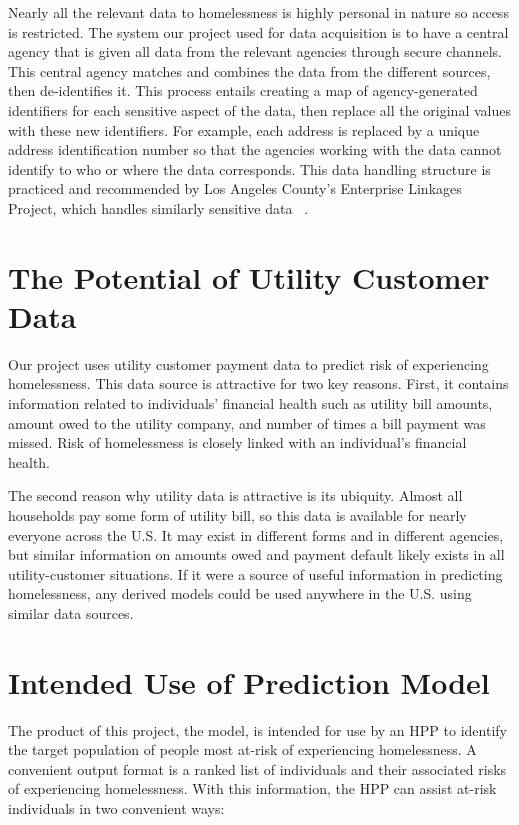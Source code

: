 \documentclass[10pt,letterpaper]{article}
\begin{document}
Nearly all the relevant data to homelessness is highly personal in nature so access is restricted. The system our project used for data acquisition is to have a central agency that is given all data from the relevant agencies through secure channels. This central agency matches and combines the data from the different sources, then de-identifies it. This process entails creating a map of agency-generated identifiers for each sensitive aspect of the data, then replace all the original values with these new identifiers. For example, each address is replaced by a unique address identification number so that the agencies working with the data cannot identify to who or where the data corresponds. This data handling structure is practiced and recommended by Los Angeles County’s Enterprise Linkages Project, which handles similarly sensitive data ~\cite{byrne2012angeles}.

\section{The Potential of Utility Customer Data}
Our project uses utility customer payment data to predict risk of experiencing homelessness. This data source is attractive for two key reasons. First, it contains information related to individuals' financial health such as utility bill amounts, amount owed to the utility company, and number of times a bill payment was missed. Risk of homelessness is closely linked with an individual's financial health.

The second reason why utility data is attractive is its ubiquity. Almost all households pay some form of utility bill, so this data is available for nearly everyone across the U.S. It may exist in different forms and in different agencies, but similar information on amounts owed and payment default likely exists in all utility-customer situations. If it were a source of useful information in predicting homelessness, any derived models could be used anywhere in the U.S. using similar data sources. 

\section{Intended Use of Prediction Model}
The product of this project, the model, is intended for use by an HPP to identify the target population of people most at-risk of experiencing homelessness. A convenient output format is a ranked list of individuals and their associated risks of experiencing homelessness. With this information, the HPP can assist at-risk individuals in two convenient ways:
\end{document}
